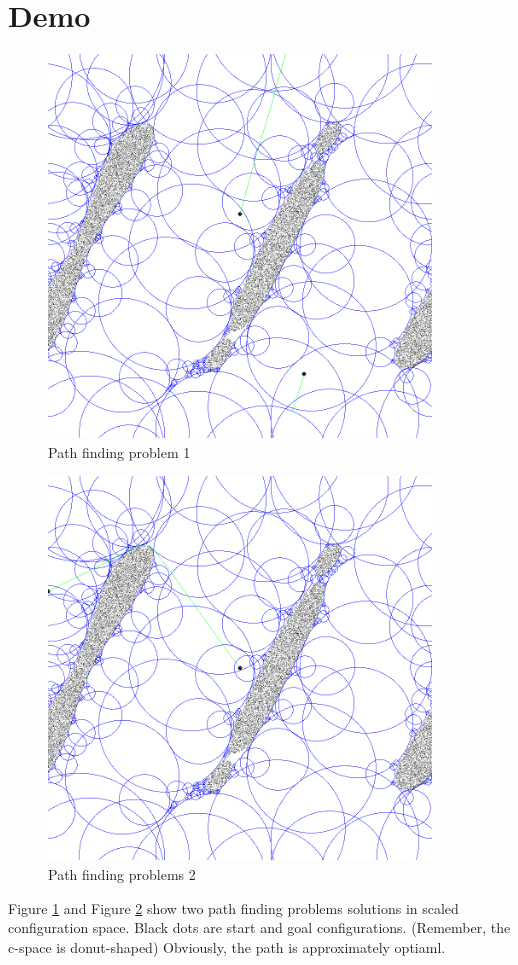 \documentclass{article}
\begin{document}
\section{Demo}
    \begin{figure}[h]
      \centering
      \includegraphics[width=4in]{Path1.PNG}
      \caption{Path finding problem 1}
      \label{fig:path1}
    \end{figure}
    \begin{figure}[h]
      \centering
      \includegraphics[width=4in]{Path2.PNG}
      \caption{Path finding problems 2}
      \label{fig:path2}
    \end{figure}

    Figure \ref{fig:path1} and Figure \ref{fig:path2} show two path finding problems solutions in scaled configuration space. Black dots are start and goal configurations. (Remember, the c-space is donut-shaped) Obviously, the path is approximately optiaml.
\end{document}

